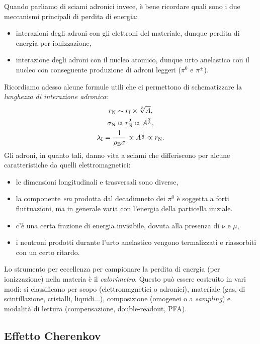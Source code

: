 Quando parliamo di sciami adronici invece, è bene ricordare quali sono i due meccanismi principali di perdita di energia:
\begin{itemize}
    \item interazioni degli adroni con gli elettroni del materiale, dunque perdita di energia per ionizzazione,
    \item interazione degli adroni con il nucleo atomico, dunque urto anelastico con il nucleo con conseguente produzione di adroni leggeri ($\pi^0$ e $\pi^\pm$).
\end{itemize}
Ricordiamo adesso alcune formule utili che ci permettono di schematizzare la \emph{lunghezza di interazione adronica}:
\begin{gather*}
    r_\textup{N} \sim r_\textup{f} \times \sqrt[3]{A}, \\
    \sigma_\textup{N} \varpropto r_\textup{N}^2 \varpropto A^{\frac{2}{3}}, \\
    \lambda_\textup{I} = \frac{1}{\rho_\textup{B}\sigma} \varpropto A^{\frac{1}{3}} \varpropto r_\textup{N}.
\end{gather*}
Gli adroni, in quanto tali, danno vita a sciami che differiscono per alcune caratteristiche da quelli elettromagnetici:
\begin{itemize}
    \item le dimensioni longitudinali e trasversali sono diverse,
    \item la componente \textit{em} prodotta dal decadimneto dei $\pi^0$ è soggetta a forti fluttuazioni, ma in generale varia con l'energia della particella iniziale.
    \item c'è una certa frazione di energia invisibile, dovuta alla presenza di $\nu$ e $\mu$,
    \item i neutroni prodotti durante l'urto anelastico vengono termalizzati e riassorbiti con un certo ritardo.
\end{itemize}
Lo strumento per eccellenza per campionare la perdita di energia (per ionizzazione) nella materia è il \emph{calorimetro}. Questo può essere costruito in vari modi: si classificano per scopo (elettromagnetici o adronici), materiale (gas, di scintillazione, cristalli, liquidi...), composizione (omogenei o a \emph{sampling}) e modalità di lettura (compensazione, double-readout, PFA).

\subsection*{Effetto Cherenkov}

